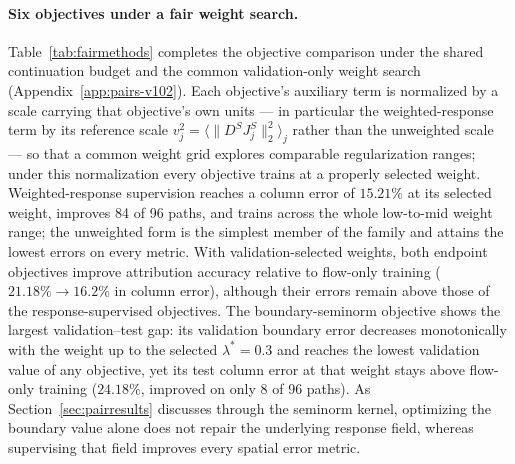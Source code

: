\paragraph{Six objectives under a fair weight search.}
Table~\ref{tab:fairmethods} completes the objective comparison under
the shared continuation budget and the common validation-only weight
search (Appendix~\ref{app:pairs-v102}). Each objective's auxiliary
term is normalized by a scale carrying that objective's own units ---
in particular the weighted-response term by its reference scale
$v_j^2=\langle\|D^SJ_j^S\|_2^2\rangle_j$ rather than the unweighted
scale --- so that a common weight grid explores comparable
regularization ranges; under this normalization every objective trains
at a properly selected weight. Weighted-response supervision reaches a
column error of $15.21\%$ at its selected weight, improves 84 of 96
paths, and trains across the whole low-to-mid weight range; the
unweighted form is the simplest member of the family and attains the
lowest errors on every metric. With validation-selected weights, both
endpoint objectives improve attribution accuracy relative to flow-only
training ($21.18\%\to16.2\%$ in column error), although their errors
remain above those of the response-supervised objectives. The
boundary-seminorm objective shows the largest validation--test gap:
its validation boundary error decreases monotonically with the weight
up to the selected $\lambda^*=0.3$ and reaches the lowest validation
value of any objective, yet its test column error at that weight stays
above flow-only training ($24.18\%$, improved on only 8 of 96 paths).
As Section~\ref{sec:pairresults} discusses through the seminorm
kernel, optimizing the boundary value alone does not repair the
underlying response field, whereas supervising that field improves
every spatial error metric.
